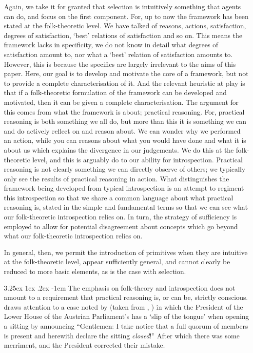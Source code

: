 \documentclass[10pt]{article}
\makeatletter
\renewcommand\paragraph{\@startsection{paragraph}{5}{\z@}%
  {3.25ex \@plus1ex \@minus.2ex}%
  {-1em}%
  {\normalfont\normalsize\bfseries}}
\makeatother
\begin{document}
Again, we take it for granted that selection is intuitively something that agents can do, and focus on the first component.
For, up to now the framework has been stated at the folk-theoretic level.
We have talked of reasons, actions, satisfaction, degrees of satisfaction, `best' relations of satisfaction and so on.
This means the framework lacks in specificity, we do not know in detail what degrees of satisfaction amount to, nor what a `best' relation of satisfaction amounts to.
However, this is because the specifics are largely irrelevant to the aims of this paper.
Here, our goal is to develop and motivate the core of a framework, but not to provide a complete characterisation of it.
And the relevant heuristic at play is that if a folk-theoretic formulation of the framework can be developed and motivated, then it can be given a complete characterisation.
The argument for this comes from what the framework is about; practical reasoning.
For, practical reasoning is both something we all do, but more than this it is something we can and do actively reflect on and reason about.
We can wonder why we performed an action, while you can reasons about what you would have done and what it is about us which explains the divergence in our judgements.
We do this at the folk-theoretic level, and this is arguably do to our ability for introspection.
Practical reasoning is not clearly something we can directly observe of others; we typically only see the results of practical reasoning in action.
What distinguishes the framework being developed from typical introspection is an attempt to regiment this introspection so that we share a common language about what practical reasoning is, stated in the simple and fundamental terms so that we can see what our folk-theoretic introspection relies on.
In turn, the strategy of sufficiency is employed to allow for potential disagreement about concepts which go beyond what our folk-theoretic introspection relies on.

In general, then, we permit the introduction of primitives when they are intuitive at the folk-theoretic level, appear sufficiently general, and cannot clearly be reduced to more basic elements, as is the case with selection.

\paragraph{ } %
The emphasis on folk-theory and introspection does not amount to a requirement that practical reasoning is, or can be, strictly conscious.
\citeauthor{Velleman:2000aa} draws attention to a case noted by \citeauthor{Freud:1960aa} (taken from \citeauthor{Meringer:1900aa}, \citeyear{Meringer:1900aa}) in which the President of the Lower House of the Austrian Parliament's has a `slip of the tongue' when opening a sitting by announcing ``Gentlemen: I take notice that a full quorum of members is present and herewith declare the sitting \emph{closed}!''
After which there was some merriment, and the President corrected their mistake.
\end{document}
